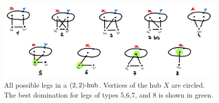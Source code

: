 \begin{figure}
    \includegraphics[width=\textwidth]{figures/domset-22-legs.png}
    \caption{All possible legs in a $\sdhub[2,2]$. Vertices of the hub $X$ are circled. The best domination for legs of types 5,6,7, and 8 is shown in green. }
    \label{fig:domset-22-legs}
\end{figure}